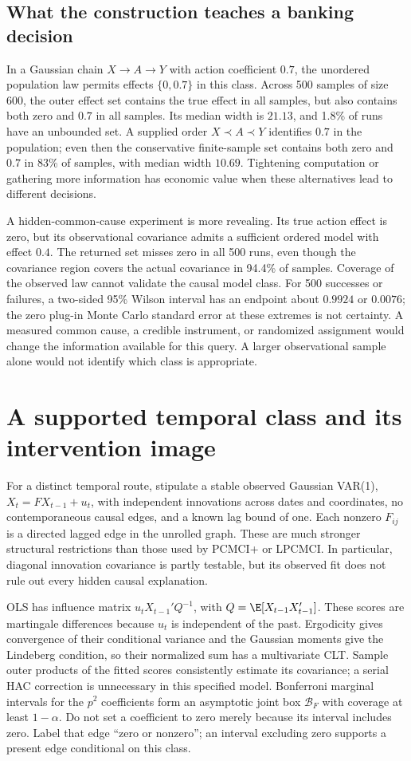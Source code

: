 \subsection{What the construction teaches a banking decision}
In a Gaussian chain $X\to A\to Y$ with action coefficient $0.7$,
the unordered population law permits effects $\{0,0.7\}$ in this
class. Across 500 samples of size 600, the outer effect set contains the
true effect in all samples, but also contains both zero and $0.7$ in
all samples. Its median width is $21.13$, and 1.8\% of runs have an
unbounded set. A supplied order $X\prec A\prec Y$ identifies $0.7$
in the population; even then the conservative finite-sample set contains
both zero and $0.7$ in 83\% of samples, with median width $10.69$.
Tightening computation or gathering more information has economic value
when these alternatives lead to different decisions.

A hidden-common-cause experiment is more revealing. Its true action
effect is zero, but its observational covariance admits a sufficient
ordered model with effect $0.4$. The returned set misses zero in all
500 runs, even though the covariance region covers the actual covariance
in 94.4\% of samples. Coverage of the observed law cannot validate the
causal model class. For 500 successes or failures, a two-sided 95\%
Wilson interval has an endpoint about $0.9924$ or $0.0076$; the zero
plug-in Monte Carlo standard error at these extremes is not certainty.
A measured common cause, a credible instrument, or randomized assignment
would change the information available for this query. A larger
observational sample alone would not identify which class is appropriate.

\section{A supported temporal class and its intervention image}
\label{s4:temporal-graph-confidence}
For a distinct temporal route, stipulate a stable observed Gaussian
VAR(1), $X_t=FX_{t-1}+u_t$, with independent innovations across dates
and coordinates, no contemporaneous causal edges, and a known lag bound
of one. Each nonzero $F_{ij}$ is a directed lagged edge in the unrolled
graph. These are much stronger structural restrictions than those used
by PCMCI+ or LPCMCI. In particular, diagonal innovation covariance is
partly testable, but its observed fit does not rule out every hidden
causal explanation.

OLS has influence matrix $u_tX_{t-1}'Q^{-1}$, with
$Q=\E[X_{t-1}X_{t-1}']$. These scores are martingale differences
because $u_t$ is independent of the past. Ergodicity gives convergence
of their conditional variance and the Gaussian moments give the
Lindeberg condition, so their normalized sum has a multivariate CLT.
Sample outer products of the fitted scores consistently estimate its
covariance; a serial HAC correction is unnecessary in this specified
model. Bonferroni marginal intervals for the $p^2$ coefficients form
an asymptotic joint box $\mathcal B_F$ with coverage at least $1-\alpha$.
Do not set a coefficient to zero merely because its interval includes zero.
Label that edge ``zero or nonzero''; an interval excluding zero supports
a present edge conditional on this class.

